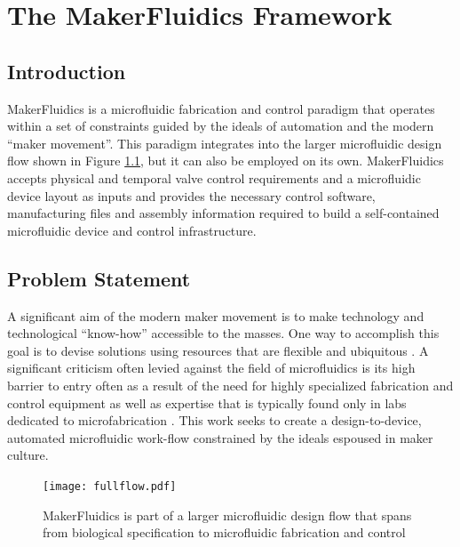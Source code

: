\chapter{The MakerFluidics Framework}
\label{chapter:mf}
\thispagestyle{myheadings}

\graphicspath{{2_MakerFluidics/Figures/}}

\section{Introduction}
\label{sec:mfIntro}

MakerFluidics is a microfluidic fabrication and control paradigm that operates within a set of constraints guided by the ideals of automation and the modern ``maker movement''. This paradigm integrates into the larger microfluidic design flow shown in Figure \ref{fig:fullflow}, but it can also be employed on its own. MakerFluidics accepts physical and temporal valve control requirements and a microfluidic device layout as inputs and provides the necessary control software, manufacturing files and assembly information required to build a self-contained microfluidic device and control infrastructure.

\section{Problem Statement}
\label{sec:mfPS}
A significant aim of the modern maker movement is to make technology and technological ``know-how'' accessible to the masses. One way to accomplish this goal is to devise solutions using resources that are flexible and ubiquitous \cite{schrock2014education}. A significant criticism often levied against the field of microfluidics is its high barrier to entry often as a result of the need for highly specialized fabrication and control equipment as well as expertise that is typically found only in labs dedicated to microfabrication \cite{whitesides2006}. This work seeks to create a design-to-device, automated microfluidic work-flow constrained by the ideals espoused in maker culture. 

\begin{figure}[h]
  \begin{minipage}[t]{0.99\linewidth}\centering
    \texttt{[image: fullflow.pdf]}
    \medskip
  \end{minipage}\hfill
  \caption[Specify--Design--Build Workflow]{MakerFluidics is part of a larger microfluidic design flow that spans from biological specification to microfluidic fabrication and control}
    \label{fig:fullflow}
\end{figure}


